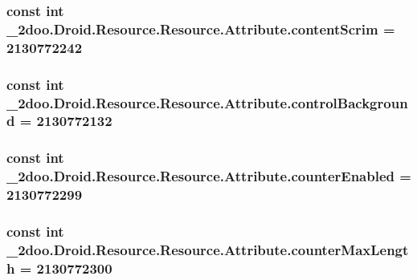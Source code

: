 \hypertarget{class__2doo_1_1_droid_1_1_resource_1_1_attribute_78b6ff409e7f5f53ad080e2140f97d20}{
\subsubsection[{contentScrim}]{\setlength{\rightskip}{0pt plus 5cm}const int \_\-2doo.Droid.Resource.Resource.Attribute.contentScrim = 2130772242}}
\label{class__2doo_1_1_droid_1_1_resource_1_1_attribute_78b6ff409e7f5f53ad080e2140f97d20}


\hypertarget{class__2doo_1_1_droid_1_1_resource_1_1_attribute_ef4a89660af32b41ae07e0ff7b815b04}{
\subsubsection[{controlBackground}]{\setlength{\rightskip}{0pt plus 5cm}const int \_\-2doo.Droid.Resource.Resource.Attribute.controlBackground = 2130772132}}
\label{class__2doo_1_1_droid_1_1_resource_1_1_attribute_ef4a89660af32b41ae07e0ff7b815b04}


\hypertarget{class__2doo_1_1_droid_1_1_resource_1_1_attribute_5c2eef4032ea2f604bb2d12e28f3d83d}{
\subsubsection[{counterEnabled}]{\setlength{\rightskip}{0pt plus 5cm}const int \_\-2doo.Droid.Resource.Resource.Attribute.counterEnabled = 2130772299}}
\label{class__2doo_1_1_droid_1_1_resource_1_1_attribute_5c2eef4032ea2f604bb2d12e28f3d83d}


\hypertarget{class__2doo_1_1_droid_1_1_resource_1_1_attribute_27b35f8b8b1cb168cc725ed149c0feea}{
\subsubsection[{counterMaxLength}]{\setlength{\rightskip}{0pt plus 5cm}const int \_\-2doo.Droid.Resource.Resource.Attribute.counterMaxLength = 2130772300}}
\label{class__2doo_1_1_droid_1_1_resource_1_1_attribute_27b35f8b8b1cb168cc725ed149c0feea}


